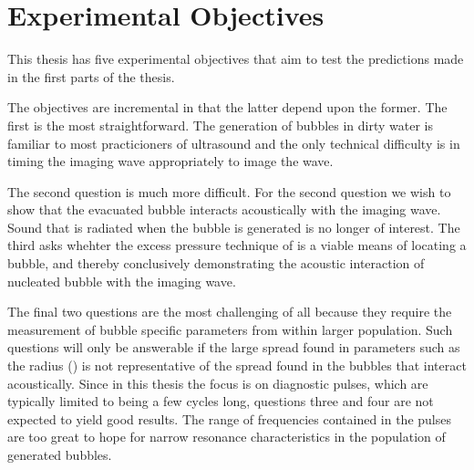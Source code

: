 \section{Experimental Objectives} \label{sec:WE:objectives}

This thesis has five experimental objectives that aim to test the predictions made in the first parts of the thesis.

The objectives are incremental in that the latter depend upon the former.
The first is the most straightforward.
The generation of bubbles in dirty water is familiar to most practicioners of ultrasound
and the only technical difficulty is in timing the imaging wave appropriately to image the wave.

The second question is much more difficult.
For the second question we wish to show that the evacuated bubble interacts acoustically with the imaging wave.
Sound that is radiated when the bubble is generated is no longer of interest.
The third asks whehter the excess pressure technique of  is a viable means of locating a bubble, 
and thereby conclusively demonstrating the acoustic interaction of nucleated bubble with the imaging wave.

The final two questions are the most challenging of all because they require
the measurement of bubble specific parameters from within larger population.
Such questions will only be answerable if the large  spread found in parameters such
as the radius (\figref{}) is not representative of the spread found in the bubbles that interact acoustically.
Since in this thesis the focus is on diagnostic pulses, 
which are typically limited to being a few cycles long,
questions three and four are not expected to yield good results.
The range of frequencies contained in the pulses are too great to hope for narrow resonance characteristics in the population of generated bubbles.

